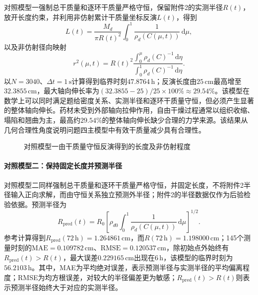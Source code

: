 \documentclass[withoutpreface,bwprint]{cumcmthesis}
\begin{document}
对照模型一强制总干质量和逐环干质量严格守恒，保留附件2的实测半径$R(t)$，放开长度约束，并利用非仿射累计干质量坐标反演$L(t)$，得到
\begin{equation}
\boxed{
L(t)=\frac{M_d}{\pi R(t)^2}
\int_0^1\frac{1}{\rho_d(C(\mu,t))}\,\mathrm d\mu,
}
\label{eq:q4-inferred-length}
\end{equation}
以及非仿射径向映射
\begin{equation}
r^2(\mu,t)=R(t)^2
\frac{\displaystyle\int_0^\mu\rho_d(C)^{-1}\,\mathrm d\eta}
{\displaystyle\int_0^1\rho_d(C)^{-1}\,\mathrm d\eta}.
\label{eq:q4-nonaffine-measured-radius}
\end{equation}
以$N=3040$、$\Delta t=1\,\mathrm s$计算得到临界时刻$47.8764\,\mathrm h$；反演长度由$25\,\mathrm{cm}$最高增至$32.3855\,\mathrm{cm}$，最大轴向伸长率为$(32.3855-25)/25\times100\%\approx29.54\%$。该模型在数学上可以同时满足题给密度关系、实测半径和逐环干质量守恒，但必须产生显著的整体轴向伸长。药材未受到外部轴向拉伸作用，自由干燥过程通常以组织收缩、塌陷和翘曲为主，最高约$29.54\%$的整体轴向伸长缺少合理的力学来源。该结果从几何合理性角度说明问题四主模型中有效干质量减少具有合理性。

\begin{figure}[H]
\centering

\caption{对照模型一由干质量守恒反演得到的长度及非仿射程度}
\label{fig:q4-inferred-length}
\end{figure}

\paragraph{对照模型二：保持固定长度并预测半径}

对照模型二同样强制总干质量和逐环干质量严格守恒，并固定长度，不将附件2半径输入正向求解，而由守恒关系独立预测外半径；附件2的半径数据仅作为后验检验依据。预测半径为
\begin{equation}
\boxed{
R_{\mathrm{pred}}(t)
=R_0\left[
\rho_{d0}\int_0^1\frac{1}{\rho_d(C(\mu,t))}\,\mathrm d\mu
\right]^{1/2}.
}
\label{eq:q4-predicted-radius}
\end{equation}
参考计算得到$R_{\mathrm{pred}}(72\,\mathrm h)=1.264861\,\mathrm{cm}$，而$R(72\,\mathrm h)=1.198000\,\mathrm{cm}$；145个测量时刻的$\mathrm{MAE}=0.109782\,\mathrm{cm}$、$\mathrm{RMSE}=0.120537\,\mathrm{cm}$，除初始点外始终有$R_{\mathrm{pred}}(t)>R(t)$，最大误差$0.229165\,\mathrm{cm}$出现在$6\,\mathrm h$，该模型的临界时刻为$56.2103\,\mathrm h$。其中，MAE为平均绝对误差，表示预测半径与实测半径的平均偏离程度；RMSE为均方根误差，对较大的半径偏差更为敏感；$R_{\mathrm{pred}}(t)>R(t)$则表示预测半径始终大于对应的实测半径。
\end{document}
